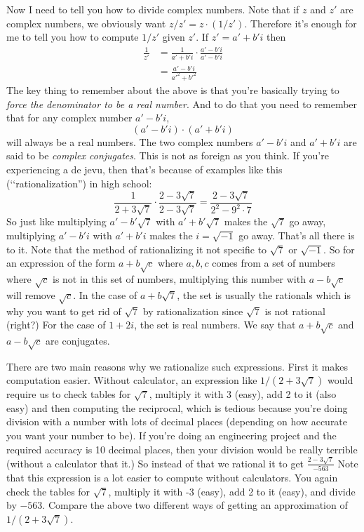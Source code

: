 Now I need to tell you how to divide complex numbers.
Note that if $z$ and $z'$ are complex numbers, we obviously want $z/z' = z \cdot (1/z')$.
Therefore it's enough for me to tell you how to compute $1/z'$ given $z'$.
If $z' = a' + b'i$ then
\begin{align*}
\frac{1}{z'} 
&= \frac{1}{a' + b'i} \cdot \frac{a' - b'i}{a' - b'i} \\
&= \frac{a' - b'i}{a'^2 + b'^2}
\end{align*}
The key thing to remember about the above is that you're
basically trying to \textit{force the denominator to be a real number}.
And to do that you need to remember that
for any complex number $a' - b'i$, 
\[
(a' - b'i) \cdot (a' + b'i)
\]
will always be a real numbers.
The two complex numbers $a' - b'i$ and $a' + b'i$ are said to be
\textit{complex conjugates}.
This is not as foreign as you think.
If you're experiencing a de jevu, then that's because of examples like 
this (\lq\lq rationalization'') in high school:
\[
\frac{1}{2 + 3 \sqrt{7}} 
\cdot 
\frac{2 - 3\sqrt{7}}{2 - 3\sqrt{7}}
= \frac{2 - 3\sqrt{7}}{2^2 - 9^2 \cdot 7}
\]
So just like multiplying $a' - b' \sqrt{7}$ with $a' + b' \sqrt{7}$
makes the $\sqrt{7}$ go away, multiplying $a' - b'i$ with $a' + b'i$
makes the $i = \sqrt{-1}$ go away.
That's all there is to it.
Note that the method of rationalizing it not specific to $\sqrt{7}$ or
$\sqrt{-1}$. So for an expression of the form $a + b\sqrt{c}$ 
where $a, b, c$ comes from a set of numbers where $\sqrt{c}$ is not in 
this set of numbers, multiplying this number with $a - b\sqrt{c}$
will remove $\sqrt{c}$. 
In the case of $a + b\sqrt{7}$, the set is usually the rationals
which is why you want to get rid of $\sqrt{7}$ by rationalization
since $\sqrt{7}$ is not rational (right?)
For the case of $1 + 2i$, the set is real numbers.
We say that $a + b\sqrt{c}$ and $a - b \sqrt{c}$
are conjugates.

There are two main reasons why we rationalize such expressions.
First it makes computation easier.
Without calculator, an expression like $1/(2 + 3 \sqrt{7})$
would require us to check tables for $\sqrt{7}$, multiply it with $3$ (easy),
add 2 to it (also easy) and then computing the reciprocal, which is
tedious because you're doing division with a number with lots of decimal 
places 
(depending on how accurate you want your number to be).
If you're doing an engineering project and the required accuracy is 10 decimal
places, then your division would be really terrible 
(without a calculator that it.)
So instead of that we rational it to get $\frac{2 - 3\sqrt{7}}{-563}$
Note that this expression is a lot easier to compute without calculators.
You again check the tables for $\sqrt{7}$, multiply it with -3 (easy),
add 2 to it (easy), and divide by $-563$. 
Compare the above two different ways of getting an approximation of 
$1/(2 + 3 \sqrt{7})$.

